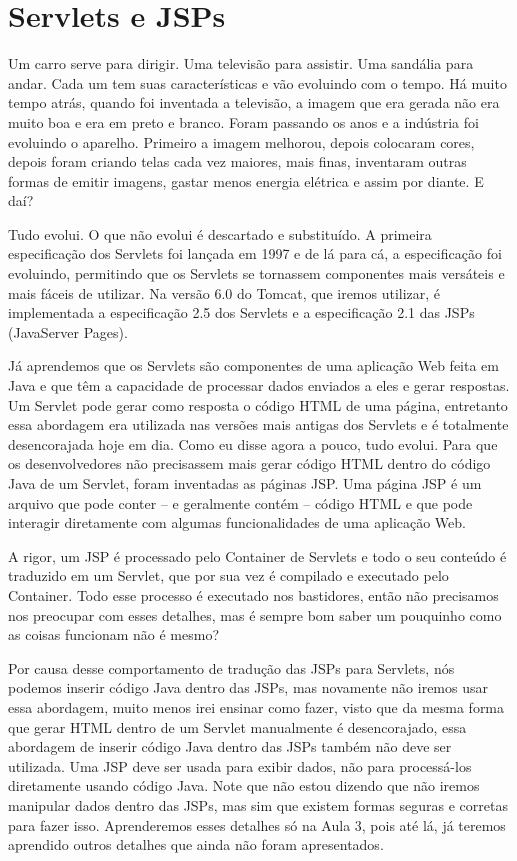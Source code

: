 \section{Servlets e JSPs}

Um carro serve para dirigir. Uma televisão para assistir. Uma sandália para andar. Cada um tem suas características e vão evoluindo com o tempo. Há muito tempo atrás, quando foi inventada a televisão, a imagem que era gerada não era muito boa e era em preto e branco. Foram passando os anos e a indústria foi evoluindo o aparelho. Primeiro a imagem melhorou, depois colocaram cores, depois foram criando telas cada vez maiores, mais finas, inventaram outras formas de emitir imagens, gastar menos energia elétrica e assim por diante. E daí?

Tudo evolui. O que não evolui é descartado e substituído. A primeira especificação dos Servlets foi lançada em 1997 e de lá para cá, a especificação foi evoluindo, permitindo que os Servlets se tornassem componentes mais versáteis e mais fáceis de utilizar. Na versão 6.0 do Tomcat, que iremos utilizar, é implementada a especificação 2.5 dos Servlets e a especificação 2.1 das JSPs (JavaServer Pages).

Já aprendemos que os Servlets são componentes de uma aplicação Web feita em Java e que têm a capacidade de processar dados enviados a eles e gerar respostas. Um Servlet pode gerar como resposta o código HTML de uma página, entretanto essa abordagem era utilizada nas versões mais antigas dos Servlets e é totalmente desencorajada hoje em dia. Como eu disse agora a pouco, tudo evolui. Para que os desenvolvedores não precisassem mais gerar código HTML dentro do código Java de um Servlet, foram inventadas as páginas JSP. Uma página JSP é um arquivo que pode conter – e geralmente contém – código HTML e que pode interagir diretamente com algumas funcionalidades de uma aplicação Web.

A rigor, um JSP é processado pelo Container de Servlets e todo o seu conteúdo é traduzido em um Servlet, que por sua vez é compilado e executado pelo Container. Todo esse processo é executado nos bastidores, então não precisamos nos preocupar com esses detalhes, mas é sempre bom saber um pouquinho como as coisas funcionam não é mesmo?

Por causa desse comportamento de tradução das JSPs para Servlets, nós podemos inserir código Java dentro das JSPs, mas novamente não iremos usar essa abordagem, muito menos irei ensinar como fazer, visto que da mesma forma que gerar HTML dentro de um Servlet manualmente é desencorajado, essa abordagem de inserir código Java dentro das JSPs também não deve ser utilizada. Uma JSP deve ser usada para exibir dados, não para processá-los diretamente usando código Java. Note que não estou dizendo que não iremos manipular dados dentro das JSPs, mas sim que existem formas seguras e corretas para fazer isso. Aprenderemos esses detalhes só na Aula 3, pois até lá, já teremos aprendido outros detalhes que ainda não foram apresentados.


